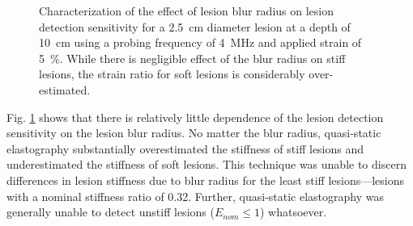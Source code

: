 			\begin{figure}[!htb]
				\centering
				\caption[Quasi-static lesion blur radius characterization]{Characterization of the effect of lesion blur radius on lesion detection sensitivity for a \SI{2.5}{\cm} diameter lesion at a depth of \SI{10}{\cm} using a probing frequency of \SI{4}{\MHz} and applied strain of \SI{5}{\percent}. While there is negligible effect of the blur radius on stiff lesions, the strain ratio for soft lesions is considerably over-estimated.}
				\label{fig:blur_radius_characterization}
			\end{figure}

			Fig. \ref{fig:blur_radius_characterization} shows that there is relatively little dependence of the lesion detection sensitivity on the lesion blur radius. No matter the blur radius, quasi-static elastography substantially overestimated the stiffness of stiff lesions and underestimated the stiffness of soft lesions. This technique was unable to discern differences in lesion stiffness due to blur radius for the least stiff lesions---lesions with a nominal stiffness ratio of 0.32. Further, quasi-static elastography was generally unable to detect unstiff lesions ($E_{nom} \leq 1$) whatsoever.

